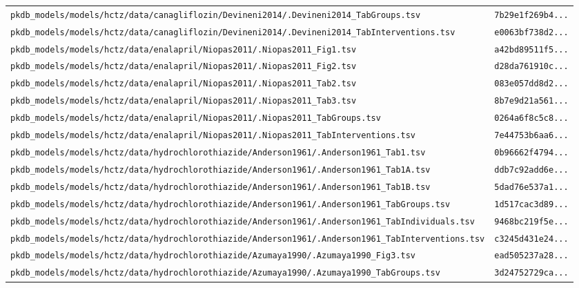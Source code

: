 \documentclass{article}
\begin{document}
\begin{longtable}{ll}
\texttt{pkdb\_models/models/hctz/data/canagliflozin/Devineni2014/.Devineni2014\_TabGroups.tsv} & \texttt{7b29e1f269b4...} \\
\texttt{pkdb\_models/models/hctz/data/canagliflozin/Devineni2014/.Devineni2014\_TabInterventions.tsv} & \texttt{e0063bf738d2...} \\
\texttt{pkdb\_models/models/hctz/data/enalapril/Niopas2011/.Niopas2011\_Fig1.tsv} & \texttt{a42bd89511f5...} \\
\texttt{pkdb\_models/models/hctz/data/enalapril/Niopas2011/.Niopas2011\_Fig2.tsv} & \texttt{d28da761910c...} \\
\texttt{pkdb\_models/models/hctz/data/enalapril/Niopas2011/.Niopas2011\_Tab2.tsv} & \texttt{083e057dd8d2...} \\
\texttt{pkdb\_models/models/hctz/data/enalapril/Niopas2011/.Niopas2011\_Tab3.tsv} & \texttt{8b7e9d21a561...} \\
\texttt{pkdb\_models/models/hctz/data/enalapril/Niopas2011/.Niopas2011\_TabGroups.tsv} & \texttt{0264a6f8c5c8...} \\
\texttt{pkdb\_models/models/hctz/data/enalapril/Niopas2011/.Niopas2011\_TabInterventions.tsv} & \texttt{7e44753b6aa6...} \\
\texttt{pkdb\_models/models/hctz/data/hydrochlorothiazide/Anderson1961/.Anderson1961\_Tab1.tsv} & \texttt{0b96662f4794...} \\
\texttt{pkdb\_models/models/hctz/data/hydrochlorothiazide/Anderson1961/.Anderson1961\_Tab1A.tsv} & \texttt{ddb7c92add6e...} \\
\texttt{pkdb\_models/models/hctz/data/hydrochlorothiazide/Anderson1961/.Anderson1961\_Tab1B.tsv} & \texttt{5dad76e537a1...} \\
\texttt{pkdb\_models/models/hctz/data/hydrochlorothiazide/Anderson1961/.Anderson1961\_TabGroups.tsv} & \texttt{1d517cac3d89...} \\
\texttt{pkdb\_models/models/hctz/data/hydrochlorothiazide/Anderson1961/.Anderson1961\_TabIndividuals.tsv} & \texttt{9468bc219f5e...} \\
\texttt{pkdb\_models/models/hctz/data/hydrochlorothiazide/Anderson1961/.Anderson1961\_TabInterventions.tsv} & \texttt{c3245d431e24...} \\
\texttt{pkdb\_models/models/hctz/data/hydrochlorothiazide/Azumaya1990/.Azumaya1990\_Fig3.tsv} & \texttt{ead505237a28...} \\
\texttt{pkdb\_models/models/hctz/data/hydrochlorothiazide/Azumaya1990/.Azumaya1990\_TabGroups.tsv} & \texttt{3d24752729ca...} \\

\end{longtable}
\end{document}
